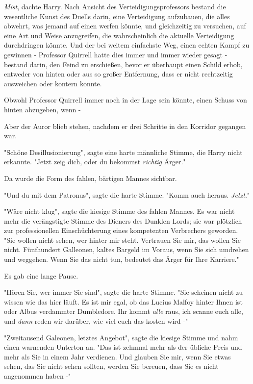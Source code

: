 {\emph{Mist}, dachte Harry. Nach Ansicht des Verteidigungsprofessors bestand die wesentliche Kunst des Duells darin, eine Verteidigung aufzubauen, die alles abwehrt, was jemand auf einen werfen könnte, und gleichzeitig zu versuchen, auf eine Art und Weise anzugreifen, die wahrscheinlich die aktuelle Verteidigung durchdringen könnte. Und der bei weitem einfachste Weg, einen echten Kampf zu gewinnen - Professor Quirrell hatte dies immer und immer wieder gesagt - bestand darin, den Feind zu erschießen, bevor er überhaupt einen Schild erhob, entweder von hinten oder aus so großer Entfernung, dass er nicht rechtzeitig ausweichen oder kontern konnte.

Obwohl Professor Quirrell immer noch in der Lage sein könnte, einen Schuss von hinten abzugeben, wenn -

Aber der Auror blieb stehen, nachdem er drei Schritte in den Korridor gegangen war.

"Schöne Desillusionierung", sagte eine harte männliche Stimme, die Harry nicht erkannte. "Jetzt zeig dich, oder du bekommst \emph{richtig} Ärger."

Da wurde die Form des fahlen, bärtigen Mannes sichtbar.

"Und du mit dem Patronus", sagte die harte Stimme. "Komm auch heraus. \emph{Jetzt}."

"Wäre nicht klug", sagte die kiesige Stimme des fahlen Mannes. Es war nicht mehr die verängstigte Stimme des Dieners des Dunklen Lords; sie war plötzlich zur professionellen Einschüchterung eines kompetenten Verbrechers geworden. "Sie wollen nicht sehen, wer hinter mir steht. Vertrauen Sie mir, das wollen Sie nicht. Fünfhundert Galleonen, kaltes Bargeld im Voraus, wenn Sie sich umdrehen und weggehen. Wenn Sie das nicht tun, bedeutet das Ärger für Ihre Karriere."

Es gab eine lange Pause.

"Hören Sie, wer immer Sie sind", sagte die harte Stimme. "Sie scheinen nicht zu wissen wie das hier läuft. Es ist mir egal, ob das Lucius Malfoy hinter Ihnen ist oder Albus verdammter Dumbledore. Ihr kommt \emph{alle} raus, ich scanne euch alle, und \emph{dann} reden wir darüber, wie viel euch das kosten wird -"

"Zweitausend Galeonen, letztes Angebot", sagte die kiesige Stimme und nahm einen warnenden Unterton an. "Das ist zehnmal mehr als der übliche Preis und mehr als Sie in einem Jahr verdienen. Und glauben Sie mir, wenn Sie etwas sehen, das Sie nicht sehen sollten, werden Sie bereuen, dass Sie es nicht angenommen haben -"

}
